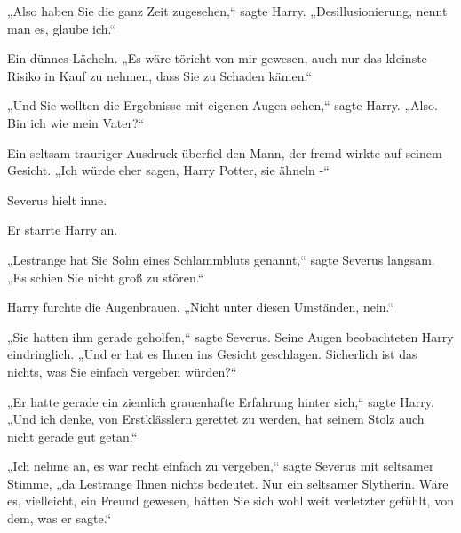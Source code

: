 „Also haben Sie die ganz Zeit zugesehen,“ sagte Harry. „Desillusionierung, nennt man es, glaube ich.“

Ein dünnes Lächeln. „Es wäre töricht von mir gewesen, auch nur das kleinste Risiko in Kauf zu nehmen, dass Sie zu Schaden kämen.“

„Und Sie wollten die Ergebnisse mit eigenen Augen sehen,“ sagte Harry. „Also. Bin ich wie mein Vater?“

Ein seltsam trauriger Ausdruck überfiel den Mann, der fremd wirkte auf seinem Gesicht. „Ich würde eher sagen, Harry Potter, sie ähneln -“

Severus hielt inne.

Er starrte Harry an.

„Lestrange hat Sie Sohn eines Schlammbluts genannt,“ sagte Severus langsam. „Es schien Sie nicht groß zu stören.“

Harry furchte die Augenbrauen. „Nicht unter diesen Umständen, nein.“

„Sie hatten ihm gerade geholfen,“ sagte Severus. Seine Augen beobachteten Harry eindringlich. „Und er hat es Ihnen ins Gesicht geschlagen. Sicherlich ist das nichts, was Sie einfach vergeben würden?“

„Er hatte gerade ein ziemlich grauenhafte Erfahrung hinter sich,“ sagte Harry. „Und ich denke, von Erstklässlern gerettet zu werden, hat seinem Stolz auch nicht gerade gut getan.“

„Ich nehme an, es war recht einfach zu vergeben,“ sagte Severus mit seltsamer Stimme, „da Lestrange Ihnen nichts bedeutet. Nur ein seltsamer Slytherin. Wäre es, vielleicht, ein Freund gewesen, hätten Sie sich wohl weit verletzter gefühlt, von dem, was er sagte.“

